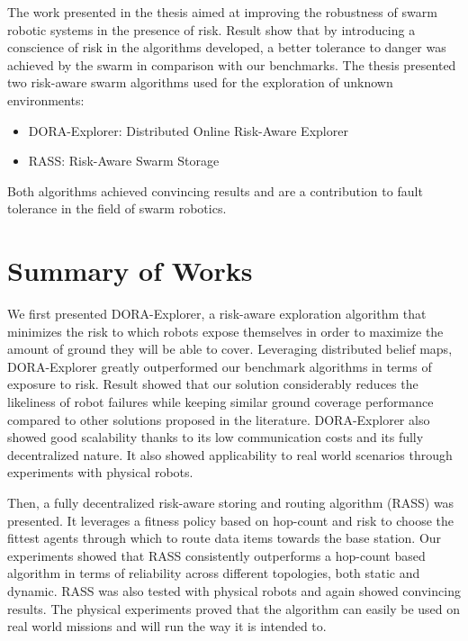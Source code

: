 \label{sec:Conclusion}
The work presented in the thesis aimed at improving the robustness of swarm robotic systems in the presence of risk. Result show that by introducing a conscience of risk in the algorithms developed, a better tolerance to danger was achieved by the swarm in comparison with our benchmarks. The thesis presented two risk-aware swarm algorithms used for the exploration of unknown environments:

\begin{itemize}
    \item DORA-Explorer: Distributed Online Risk-Aware Explorer
    \item RASS: Risk-Aware Swarm Storage
\end{itemize}

Both algorithms achieved convincing results and are a contribution to fault tolerance in the field of swarm robotics. 

\section{Summary of Works}
We first presented DORA-Explorer, a risk-aware exploration
algorithm that minimizes the risk to which robots expose themselves in
order to maximize the amount of ground they will be able to cover. Leveraging distributed belief maps, DORA-Explorer greatly outperformed our benchmark algorithms in terms of exposure to risk. Result showed that our solution considerably reduces the likeliness of robot failures while keeping similar ground coverage performance compared to other solutions proposed in
the literature. DORA-Explorer also showed good scalability thanks to its low
communication costs and its fully decentralized nature. It also showed applicability to real world scenarios through experiments with physical robots. 

Then, a fully decentralized risk-aware storing and routing algorithm (RASS) was presented. It leverages a fitness policy based on hop-count and risk to choose the fittest agents through which to route data items towards the base station. Our experiments showed that RASS consistently outperforms a hop-count based algorithm in terms of reliability across different topologies, both static and dynamic. RASS was also tested with physical robots and again showed convincing results. The physical experiments proved that the algorithm can easily be used on real world missions and will run the way it is intended to.

